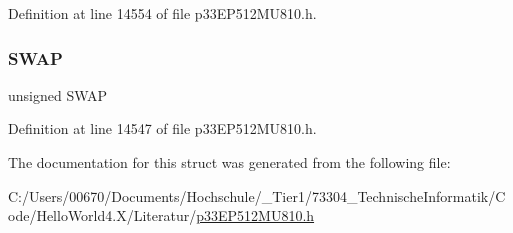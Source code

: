 Definition at line 14554 of file p33\+E\+P512\+M\+U810.\+h.

\mbox{\label{structtag_i_o_c_o_n3_b_i_t_s_a3ed0654ceb192d32e26d2929c9b8dcc2}} 
\subsubsection{\texorpdfstring{S\+W\+AP}{SWAP}}
{\footnotesize\ttfamily unsigned S\+W\+AP}



Definition at line 14547 of file p33\+E\+P512\+M\+U810.\+h.



The documentation for this struct was generated from the following file\+:\begin{DoxyCompactItemize}
\item 
C\+:/\+Users/00670/\+Documents/\+Hochschule/\+\_\+\+Tier1/73304\+\_\+\+Technische\+Informatik/\+Code/\+Hello\+World4.\+X/\+Literatur/\hyperlink{p33_e_p512_m_u810_8h}{p33\+E\+P512\+M\+U810.\+h}\end{DoxyCompactItemize}
